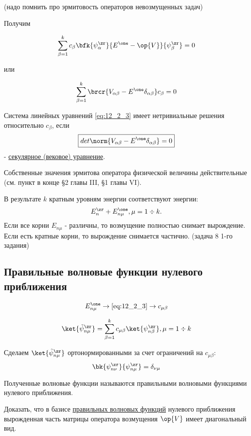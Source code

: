 (надо помнить про эрмитовость операторов невозмущенных задач)

Получим

$$
\sum_{\beta=1}^k c_\beta \bfk{\psi_{\alpha}^\zr}{E^\one - \op{V}}{\psi_{\beta}^\zr} = 0
$$

или 

\begin{equation}
\label{eq:12_2_3}
\sum_{\beta=1}^k \brcr{V_{\alpha \beta} - E^\one \delta_{\alpha \beta}} c_\beta = 0
\end{equation}  

Система линейных уравнений \eqref{eq:12_2_3} имеет нетривиальные решения относительно $c_\beta$, если 
\begin{equation}
\label{eq:12_2_4}
\boxed{det \norm{V_{\alpha \beta} - E^\one \delta_{\alpha \beta}} = 0}
\end{equation} 
- \underline{секулярное (вековое) уравнение}.

Собственные значения эрмитова оператора физической величины действительные (см. пункт в конце \S 2 главы III, \S 1 главы VI).

В результате $k$ кратным уровням энергии соответствуют энергии: 
$$
E_n^\zr + E_{n \mu} ^\one, \mu = 1 \div k.
$$
Если все корни $E_{n \mu}$ - различны, то возмущение полностью снимает вырождение. Если есть кратные корни, то вырождение снимается частично. (задача 8 1-го задания)

\subsection{Правильные волновые функции нулевого приближения}

$$
E_{n \mu}^\one \to \eqref{eq:12_2_3} \to c_{\mu \beta}
$$

$$
\ket{\tilde{\psi}_{n \mu}^\zr} = \sum_{\beta=1}^k c_{\mu \beta} \ket{\psi_{n \beta}^\zr}, \mu = 1 \div k
$$

Сделаем $\ket{\tilde{\psi}_{n \mu}^\zr}$ ортонормированными за счет ограничений на $c_{\mu \beta}$:
$$
\bk{\psi_{n \nu}^\zr}{\psi_{n \mu}^\zr} = \delta_{\nu \mu}
$$

Полученные волновые функции называются правильными волновыми функциями нулевого приближения.

\begin{excr}
Доказать, что в базисе \underline{правильных волновых функций} нулевого приближения вырожденная часть матрицы оператора возмущения $\op{V}$ имеет диагональный вид.
\end{excr}

